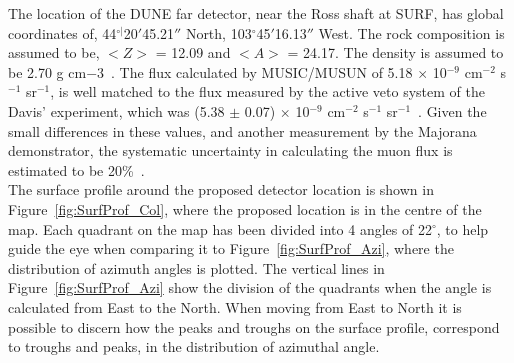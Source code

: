 The location of the DUNE far detector, near the Ross shaft at SURF, has global coordinates of, 44$^{\circ|}$20$'$45.21$''$ North, 103$^{\circ}$45$'$16.13$''$ West. The rock composition is assumed to be, $< Z >$ = 12.09 and $< A >$ = 24.17. The density is assumed to be 2.70 g cm${-3}$~\citep{Mei:2009py}. The flux calculated by MUSIC/MUSUN of 5.18 $\times$ 10$^{-9}$ cm$^{-2}$ s$^{-1}$ sr$^{-1}$, is well matched to the flux measured by the active veto system of the Davis' experiment, which was (5.38 $\pm$ 0.07) $\times$ 10$^{-9}$ cm$^{-2}$ s$^{-1}$ sr$^{-1}$~\citep{PhysRevD.27.1444}. Given the small differences in these values, and another measurement by the Majorana demonstrator, the systematic uncertainty in calculating the muon flux is estimated to be 20\%~\citep{NDKTFNote}. \\

The surface profile around the proposed detector location is shown in Figure~\ref{fig:SurfProf_Col}, where the proposed location is in the centre of the map. Each quadrant on the map has been divided into 4 angles of 22$^{\circ}$, to help guide the eye when comparing it to Figure~\ref{fig:SurfProf_Azi}, where the distribution of azimuth angles is plotted. The vertical lines in Figure~\ref{fig:SurfProf_Azi} show the division of the quadrants when the angle is calculated from East to the North. When moving from East to North it is possible to discern how the peaks and troughs on the surface profile, correspond to troughs and peaks, in the distribution of azimuthal angle. \\

